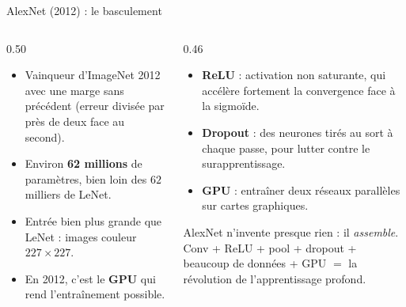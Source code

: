 \begin{frame}{AlexNet (2012) : le basculement}
\begin{columns}[t]
\begin{column}{0.50\textwidth}
\begin{itemize}
  \item Vainqueur d'ImageNet 2012 avec une marge sans précédent
  (erreur divisée par près de deux face au second).
  \item Environ \textbf{62 millions} de paramètres, bien loin des
  $62$ milliers de LeNet.
  \item Entrée bien plus grande que LeNet : images couleur $227\times227$.
  \item En 2012, c'est le \textbf{GPU} qui rend l'entraînement possible.
\end{itemize}
\end{column}
\begin{column}{0.46\textwidth}
\begin{kbox}
\begin{itemize}
  \item \textbf{ReLU} : activation non saturante, qui accélère
  fortement la convergence face à la sigmoïde.
  \item \textbf{Dropout} : des neurones tirés au sort à chaque passe,
  pour lutter contre le surapprentissage.
  \item \textbf{GPU} : entraîner deux réseaux parallèles sur cartes graphiques.
\end{itemize}
\end{kbox}
\begin{ebox}[La leçon]
AlexNet n'invente presque rien : il \emph{assemble}.
Conv + ReLU + pool + dropout + beaucoup de données + GPU $=$ la
révolution de l'apprentissage profond.
\end{ebox}
\end{column}
\end{columns}
\end{frame}

